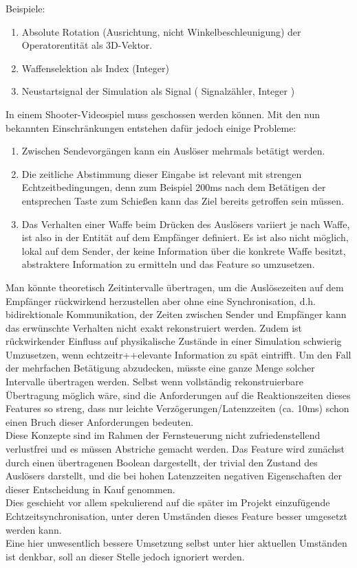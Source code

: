 Beispiele:
\begin{enumerate}
\item Absolute Rotation (Ausrichtung, nicht Winkelbeschleunigung) der Operatorentität als 3D-Vektor.
\item Waffenselektion als Index (Integer)
\item Neustartsignal der Simulation als Signal ( Signalzähler, Integer )
\end{enumerate}
In einem Shooter-Videospiel muss geschossen werden können. Mit den nun bekannten Einschränkungen entstehen dafür jedoch einige Probleme:
\begin{enumerate}
\item Zwischen Sendevorgängen kann ein Auslöser mehrmals betätigt werden.
\item Die zeitliche Abstimmung dieser Eingabe ist relevant mit strengen Echtzeitbedingungen, denn zum Beispiel 200ms nach dem Betätigen der entsprechen Taste zum Schießen kann das Ziel bereits getroffen sein müssen.
\item Das Verhalten einer Waffe beim Drücken des Auslösers variiert je nach Waffe, ist also in der Entität auf dem Empfänger definiert. Es ist also nicht möglich, lokal auf dem Sender, der keine Information über die konkrete Waffe besitzt, abstraktere Information zu ermitteln und das Feature so umzusetzen.
\end{enumerate}
Man könnte theoretisch Zeitintervalle übertragen, um die Auslösezeiten auf dem Empfänger rückwirkend herzustellen aber ohne eine Synchronisation, d.h. bidirektionale Kommunikation, der Zeiten zwischen Sender und Empfänger kann das erwünschte Verhalten nicht exakt rekonstruiert werden. Zudem ist rückwirkender Einfluss auf physikalische Zustände in einer Simulation schwierig Umzusetzen, wenn echtzeitr++elevante Information zu spät eintrifft.
Um den Fall der mehrfachen Betätigung abzudecken, müsste eine ganze Menge solcher Intervalle übertragen werden. Selbst wenn vollständig rekonstruierbare Übertragung möglich wäre, sind die Anforderungen auf die Reaktionszeiten dieses Features so streng, dass nur leichte Verzögerungen/Latenzzeiten (ca. 10ms) schon einen Bruch dieser Anforderungen bedeuten.\\
Diese Konzepte sind im Rahmen der Fernsteuerung nicht zufriedenstellend verlustfrei und es müssen Abstriche gemacht werden. Das Feature wird zunächst durch einen übertragenen Boolean dargestellt, der trivial den Zustand des Auslösers darstellt, und die bei hohen Latenzzeiten negativen Eigenschaften der dieser Entscheidung in Kauf genommen.\\
Dies geschieht vor allem spekulierend auf die später im Projekt einzufügende Echtzeitsynchronisation, unter deren Umständen dieses Feature besser umgesetzt werden kann.\\
Eine hier unwesentlich bessere Umsetzung selbst unter hier aktuellen Umständen ist denkbar, soll an dieser Stelle jedoch ignoriert werden.
